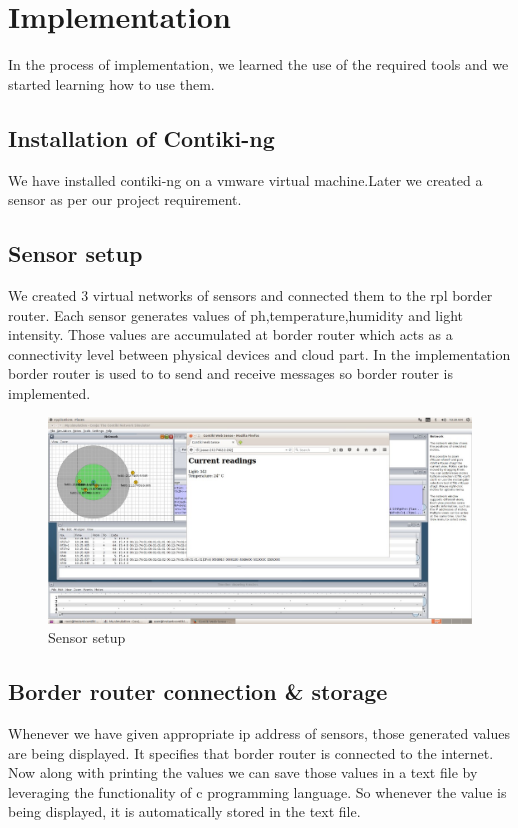 \documentclass{article}
\begin{document}
\section{Implementation } 
In the process of implementation, we learned the use of the required tools and we started learning how to use them.
\subsection{Installation of Contiki-ng }
We have installed contiki-ng on a vmware virtual machine.Later we created a sensor as per our project requirement.

\subsection{Sensor setup}
We created 3 virtual networks of sensors and connected them to the rpl border router. Each sensor generates values of ph,temperature,humidity and light intensity. Those values are accumulated at border router which acts as a connectivity level between physical devices and cloud part.
In the implementation border router is used to to send and receive messages so border router is implemented.
\begin{figure}[ht]
    \centering
    \includegraphics[width=1.0\textwidth]{contiki pic 2.jpg}
    \caption{Sensor setup}
    \label{fig:example}
\end{figure}


\subsection{Border router connection & storage}
Whenever we have given appropriate ip address of sensors, those generated values are being displayed. It specifies that border router is connected to the internet.
Now along with printing the values we can save those values in a text file by leveraging the functionality of c programming language. So whenever the value is being displayed, it is automatically stored in the text file. 
\end{document}
